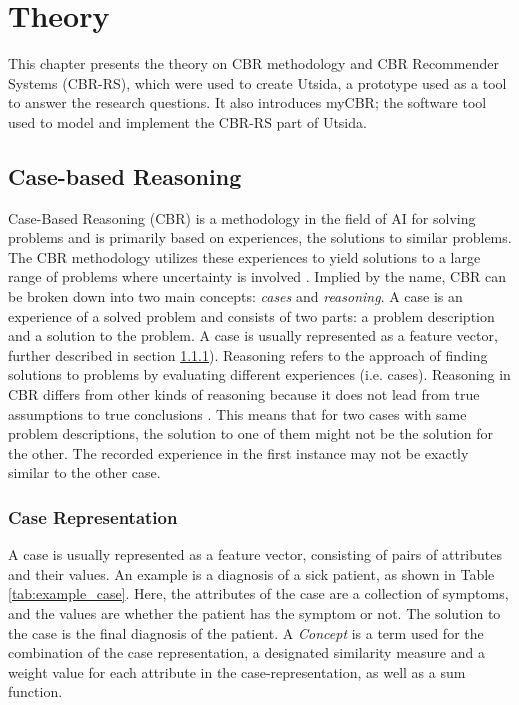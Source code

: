 \cleardoublepage

\chapter{Theory} \label{chap:3}

This chapter presents the theory on CBR methodology and CBR Recommender Systems (CBR-RS), which were used to create Utsida, a prototype used as a tool to answer the research questions. It also introduces myCBR; the software tool used to model and implement the CBR-RS part of Utsida. 

\section{Case-based Reasoning}

Case-Based Reasoning (CBR) is a methodology in the field of AI for solving problems and is primarily based on experiences, the solutions to similar problems. The CBR methodology utilizes these experiences to yield solutions to a large range of problems where uncertainty is involved \cite{richter2013case}. Implied by the name, CBR can be broken down into two main concepts: \textit{cases} and \textit{reasoning}. A case is an experience of a solved problem and consists of two parts: a problem description and a solution to the problem. A case is usually represented as a feature vector, further described in section \ref{sec:feature_vectors}). Reasoning refers to the approach of finding solutions to problems by evaluating different experiences (i.e. cases). Reasoning in CBR differs from other kinds of reasoning because it does not lead from true assumptions to true conclusions \cite{richter2013case}. This means that for two cases with same problem descriptions, the solution to one of them might not be the solution for the other. The recorded experience in the first instance may not be exactly similar to the other case.
    
\subsection{Case Representation}\label{sec:feature_vectors}
A case is usually represented as a feature vector, consisting of pairs of attributes and their values. An example is a diagnosis of a sick patient, as shown in Table \ref{tab:example_case}. Here, the attributes of the case are a collection of symptoms, and the values are whether the patient has the symptom or not. The solution to the case is the final diagnosis of the patient. A \textit{Concept} is a term used for the combination of the case representation, a designated similarity measure and a weight value for each attribute in the case-representation, as well as a sum function.

